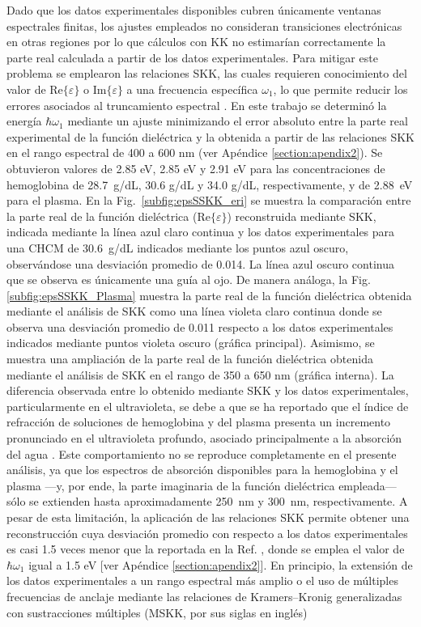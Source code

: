 Dado que los datos experimentales disponibles cubren únicamente ventanas espectrales finitas, los ajustes empleados no consideran transiciones electrónicas en otras regiones por lo que cálculos con KK no estimarían correctamente la parte real calculada a partir de los datos experimentales. Para mitigar este problema se emplearon las relaciones SKK, las cuales requieren conocimiento del valor de $\text{Re}\{\varepsilon\}$ o $\text{Im}\{\varepsilon\}$ a una frecuencia específica $\omega_1$, lo que permite reducir los errores asociados al truncamiento espectral \cite{lucariniKramersKronigRelationsOptical2005}. En este trabajo se determinó la energía $\hbar\omega_1$ mediante un ajuste minimizando el error absoluto entre la parte real experimental de la función dieléctrica y la obtenida a partir de las relaciones SKK en el rango espectral de 400 a 600 nm (ver Apéndice \ref{section:apendix2}). Se obtuvieron valores de 2.85 eV, 2.85 eV  y 2.91 eV para las concentraciones de hemoglobina de 28.7~g/dL, 30.6 g/dL y 34.0 g/dL, respectivamente, y de 2.88~eV para el plasma. En la Fig.~\ref{subfig:epsSSKK_eri} se muestra la comparación entre la parte real de la función dieléctrica ($\text{Re}\{\varepsilon\}$) reconstruida mediante SKK, indicada mediante la línea azul claro continua y los datos experimentales para una CHCM de 30.6~g/dL indicados mediante los puntos azul oscuro, observándose una desviación promedio de 0.014. La línea azul oscuro continua que se observa es únicamente una guía al ojo. De manera análoga, la Fig. \ref{subfig:epsSSKK_Plasma} muestra la parte real de la función dieléctrica obtenida mediante el análisis de SKK como una línea violeta claro continua donde se observa una desviación promedio de 0.011 respecto a los datos experimentales indicados mediante puntos violeta oscuro (gráfica principal). Asimismo, se muestra una ampliación de la parte real de la función dieléctrica obtenida mediante el análisis de SKK en el rango de 350 a 650 nm (gráfica interna). La diferencia observada entre lo obtenido mediante SKK y los datos experimentales, particularmente en el ultravioleta, se debe a que se ha reportado que el índice de refracción de soluciones de hemoglobina y del plasma presenta un incremento pronunciado en el ultravioleta profundo, asociado principalmente a la absorción del agua \cite{bosschaartLiteratureReviewNovel2014}.  Este comportamiento no se reproduce completamente en el presente análisis, ya que los espectros de absorción disponibles para la hemoglobina y el plasma ---y, por ende, la parte imaginaria de la función dieléctrica empleada--- sólo se extienden hasta aproximadamente 250~nm y 300~nm, respectivamente.  A pesar de esta limitación, la aplicación de las relaciones SKK permite obtener una reconstrucción cuya desviación promedio con respecto a los datos experimentales es casi 1.5 veces menor que la reportada en la Ref. \cite{bosschaartLiteratureReviewNovel2014}, donde se emplea el valor de $\hbar\omega_1$ igual a 1.5 eV [ver Apéndice \ref{section:apendix2}]. En principio, la extensión de los datos experimentales a un rango espectral más amplio \cite{lucariniKramersKronigRelationsOptical2005} o el uso de múltiples frecuencias de anclaje mediante las relaciones de Kramers–Kronig generalizadas con sustracciones múltiples (MSKK, por sus siglas en inglés) 